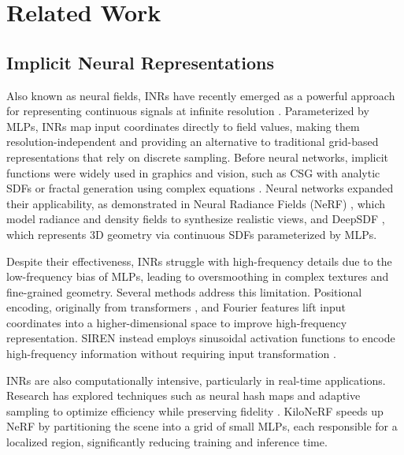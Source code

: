 \section{Related Work}

\subsection{Implicit Neural Representations}
Also known as neural fields, INRs have recently emerged as a powerful approach for representing continuous signals at infinite resolution \cite{Xie2021NeuralFields}. Parameterized by MLPs, INRs map input coordinates directly to field values, making them resolution-independent and providing an alternative to traditional grid-based representations that rely on discrete sampling. Before neural networks, implicit functions were widely used in graphics and vision, such as CSG with analytic SDFs \cite{iquilezles} or fractal generation using complex equations \cite{mandelbrot1983fractal}. Neural networks expanded their applicability, as demonstrated in Neural Radiance Fields (NeRF) \cite{mildenhall2021nerf}, which model radiance and density fields to synthesize realistic views, and DeepSDF \cite{park2019deepsdf}, which represents 3D geometry via continuous SDFs parameterized by MLPs.

Despite their effectiveness, INRs struggle with high-frequency details due to the low-frequency bias of MLPs, leading to oversmoothing in complex textures and fine-grained geometry. Several methods address this limitation. Positional encoding, originally from transformers \cite{vaswani2017attention}, and Fourier features \cite{tancik2020fourier} lift input coordinates into a higher-dimensional space to improve high-frequency representation. SIREN instead employs sinusoidal activation functions to encode high-frequency information without requiring input transformation \cite{sitzmann2020implicit}.

INRs are also computationally intensive, particularly in real-time applications. Research has explored techniques such as neural hash maps and adaptive sampling to optimize efficiency while preserving fidelity \cite{muller2022instant}. KiloNeRF \cite{reiser2021kilonerf} speeds up NeRF \cite{mildenhall2021nerf} by partitioning the scene into a grid of small MLPs, each responsible for a localized region, significantly reducing training and inference time.

